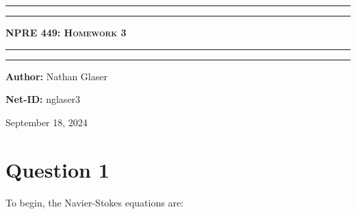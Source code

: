 \documentclass{article}
\begin{document}
\newcommand{\circled}[1]{\tikz[baseline=(char.base)]{
            \node[shape=circle,draw,inner sep=2pt] (char) {#1};}}
\begin{titlepage}

\centering
\scshape
\vspace{\baselineskip}

%
\rule{\textwidth}{1.6pt}\vspace*{-\baselineskip}\vspace*{2pt}
\rule{\textwidth}{0.4pt}

{\Huge \textbf{\textsc{NPRE 449: Homework 3 \\
\vspace{15pt}}}}

\rule{\textwidth}{0.4pt}\vspace*{-\baselineskip}\vspace{3.2pt}
\rule{\textwidth}{1.6pt}\vspace{6pt}
\vspace{1.5\baselineskip}


\large \centerline{\textbf{Author:} Nathan Glaser}
\large \centerline{\textbf{Net-ID:} nglaser3}
\quad

\vfill
\large \centerline{September 18, 2024}
%
\end{titlepage}

\tableofcontents
\newpage
{}

\newcommand{\leftrightharpoonup}{\mathrel{\mathpalette\lrhup\relax}}
\newcommand{\lrhup}[2]{\ooalign{$#1\leftharpoonup$\cr$#1\rightharpoonup$\cr}}
\newcommand{\pd}[3]{\frac{\partial^{#3}#1}{\partial#2^{#3}}}
\newcommand{\phase}{\left(\Vec{r},t\right)}
\newcommand*\vect[1]{\mkern2mu\accentset{\rightharpoonup}{#1}\mkern2mu}
\newcommand*\tensor[1]{\mkern2mu\accentset{\leftrightharpoonup}{#1}\mkern2mu}
\renewcommand{\Vec}[1]{\vect{#1}}
\newcommand{\stress}{\tensor{\mathbf{\tau}}}

\newcommand{\mass}{\pd{\rho}{t}{} + \nabla\cdot\rho\Vec{v} = 0}
\newcommand{\momentum}{\pd{\rho\Vec{v}}{t}{} + \nabla \cdot \rho\Vec{v}\Vec{v}=-\nabla P + \nabla \cdot \stress+\rho \Vec{g}}
\newcommand{\energy}{\pd{\rho u}{t}{} + \nabla\cdot\rho\Vec{v}u 
        =
        -\nabla\cdot q'' - P\nabla\cdot\Vec{v} + \stress\mathbf{:}\nabla\Vec{v}+q'''}
        
\section*{Question 1}
To begin, the Navier-Stokes equations are:
\end{document}
